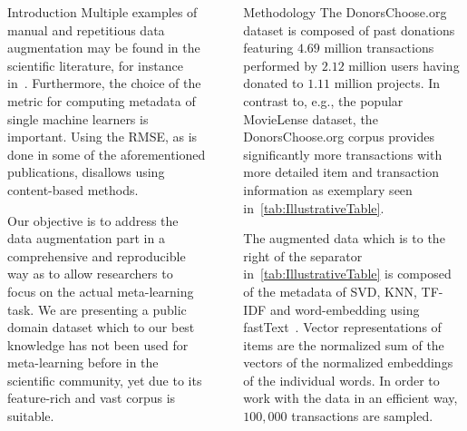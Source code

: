 \documentclass[final]{beamer}
\newcommand{\parvspace}[1]{\vspace{.5em}}  %
\begin{document}
\begin{frame}[t,fragile=singleslide]{}
\begin{columns}[t]
\begin{column}{0.45\textwidth}
\begin{block}{Introduction}
				Multiple examples of manual and repetitious data augmentation may be found in the scientific literature, for instance in~\cite{CUNHA2018128,DBLP:journals/corr/abs-1805-12118,Ekstrand:2012:RFP:2365952.2366002}. Furthermore, the choice of the metric for computing metadata of single machine learners is important. Using the RMSE, as is done in some of the aforementioned publications, disallows using content-based methods.
				\parvspace{}

				Our objective is to address the data augmentation part in a comprehensive and reproducible~\cite{UMUAI:TowardsReproducibilityInRecSysBeel2016} way as to allow researchers to focus on the actual meta-learning task. We are presenting a public domain dataset which to our best knowledge has not been used for meta-learning before in the scientific community, yet due to its feature-rich and vast corpus is suitable.
			\end{block}
		\end{column}

		{
			\color{gray}
			\hspace{-1em}
			\vrule{}
			\hspace{+1em}
		}

		\begin{column}{0.45\textwidth}
			\begin{block}{Methodology}
				The DonorsChoose.org dataset is composed of past donations featuring $4.69$ million transactions performed by $2.12$ million users having donated to $1.11$ million projects. In contrast to, e.g., the popular MovieLense dataset, the DonorsChoose.org corpus provides significantly more transactions with more detailed item and transaction information as exemplary seen in~\autoref{tab:IllustrativeTable}.
				\parvspace{}

				The augmented data which is to the right of the separator in~\autoref{tab:IllustrativeTable} is composed of the metadata of SVD, KNN, TF-IDF and word-embedding using fastText~\cite{scikit-learn,rehurek_lrec,DBLP:journals/corr/BojanowskiGJM16}. Vector representations of items are the normalized sum of the vectors of the normalized embeddings of the individual words. In order to work with the data in an efficient way, $100,000$ transactions are sampled.
				\parvspace{}


\end{block}
\end{column}
\end{columns}
\end{frame}
\end{document}
